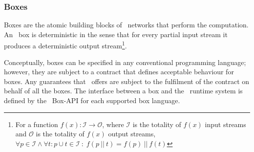     \subsubsection{Boxes}
Boxes are the atomic building blocks of \ak\ networks that perform the computation. An \ak\ box is deterministic in the sense that for every partial input stream it produces a deterministic output stream\footnote{For a function $f(x): \mathcal{I} \to \mathcal{O}$, where $\mathcal{I}$ is the totality of $f(x)$ input streams and $\mathcal{O}$ is the totality of $f(x)$ output streams, $\forall p \in \mathcal{I} \land \forall t:p \cup t \in \mathcal{I} \: : \; f(p \:||\: t) = f(p) \:||\: f(t)$}.

Conceptually, boxes can be specified in any conventional programming language; however, they are subject to a contract that defines acceptable behaviour for boxes. Any guarantees that \ak\ offers are subject to the fulfilment of the contract on behalf of all the boxes. The interface between a box and the \ak\ runtime system is defined by the \ak\ Box-API for each supported box language.

